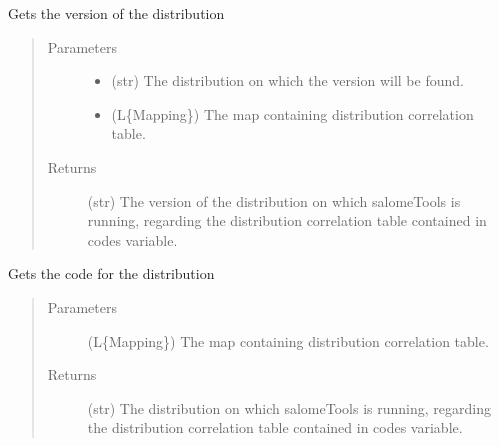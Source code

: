 \documentclass[a4paper,10pt,english]{sphinxmanual}
\begin{document}
\begin{fulllineitems}
\label{\detokenize{apidoc_src/src:src.architecture.get_distrib_version}}
Gets the version of the distribution
\begin{quote}\begin{description}
\item[{Parameters}] \leavevmode\begin{itemize}
\item {} 
 \textendash{} (str) 
The distribution on which the version will be found.

\item {} 
 \textendash{} (L\{Mapping\}) 
The map containing distribution correlation table.

\end{itemize}

\item[{Returns}] \leavevmode
(str)
The version of the distribution on which 
salomeTools is running, regarding the distribution 
correlation table contained in codes variable.

\end{description}\end{quote}

\end{fulllineitems}


\begin{fulllineitems}
\label{\detokenize{apidoc_src/src:src.architecture.get_distribution}}
Gets the code for the distribution
\begin{quote}\begin{description}
\item[{Parameters}] \leavevmode
{} \textendash{} (L\{Mapping\}) 
The map containing distribution correlation table.

\item[{Returns}] \leavevmode
(str)
The distribution on which salomeTools is running, regarding the 
distribution correlation table contained in codes variable.

\end{description}\end{quote}

\end{fulllineitems}
\end{document}
